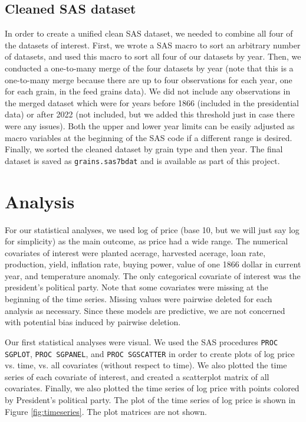 \documentclass[11pt]{article}
\begin{document}
\subsection*{Cleaned SAS dataset}

In order to create a unified clean SAS dataset, we needed to combine all four
of the datasets of interest. First, we wrote a SAS macro to sort an arbitrary
number of datasets, and used this macro to sort all four of our datasets by
year. Then, we conducted a one-to-many merge of the four datasets by year (note
that this is a one-to-many merge because there are up to four observations for
each year, one for each grain, in the feed grains data). We did not include any
observations in the merged dataset which were for years before 1866 (included
in the presidential data) or after 2022 (not included, but we added this
threshold just in case there were any issues). Both the upper and lower year
limits can be easily adjusted as macro variables at the beginning of the SAS
code if a different range is desired. Finally, we sorted the cleaned dataset by
grain type and then year. The final dataset is saved as
\texttt{grains.sas7bdat} and is available as part of this project.

\section*{Analysis}

For our statistical analyses, we used log of price (base 10,
but we will just say log for simplicity) as the main outcome, as price had a
wide range. The numerical  covariates of interest were planted acerage,
harvested acerage, loan rate,  production, yield, inflation rate, buying power,
value of one 1866 dollar in  current year, and temperature anomaly. The only
categorical covariate of interest was the president's political party. Note
that some covariates were missing at the beginning of the time series. Missing
values were pairwise deleted for each analysis as necessary. Since these models
are predictive, we are not concerned with potential bias induced by pairwise
deletion.

Our first statistical analyses were visual. We used the SAS procedures
\texttt{PROC SGPLOT}, \texttt{PROC SGPANEL}, and
\texttt{PROC SGSCATTER} in order to create plots of log price vs. time, vs. all
covariates (without respect to time). We also plotted the time series of each
covariate of interest, and created a scatterplot matrix of all covariates.
Finally, we also plotted the time series of log price with points colored by
President's political party. The plot of the time series of log price is shown
in Figure \ref{fig:timeseries}. The plot matrices are not shown.
\end{document}
